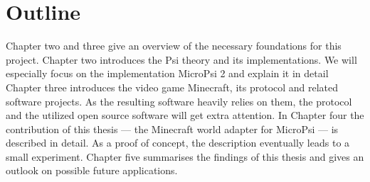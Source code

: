 \section{Outline}
Chapter two and three give an overview of the necessary foundations for this project. Chapter two introduces the Psi theory and its implementations. We will especially focus on the implementation MicroPsi 2 and explain it in detail Chapter three introduces the video game Minecraft, its protocol and related software projects. As the resulting software heavily relies on them, the protocol and the utilized open source software will get extra attention. 
In Chapter four the contribution of this thesis --- the Minecraft world adapter for MicroPsi --- is described in detail. As a proof of concept, the description eventually leads to a small experiment.
Chapter five summarises the findings of this thesis and gives an outlook on possible future applications.